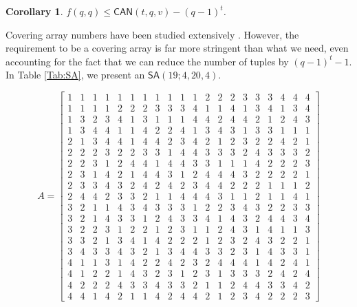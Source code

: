 \documentclass[12pt,reqno]{article}
\newtheorem{crl}[thm]{Corollary}
\newcommand{\SA}{\mathsf{SA}}
\newcommand{\CAN}{\mathsf{CAN}}
\begin{document}
\begin{crl}
 \label{Crl:SA}
$f(q,q) \le \CAN(t,q,v) - (q-1)^t$.
\end{crl}

Covering array numbers have been studied extensively \cite{tables}. However, the requirement to be a covering array is far
more stringent than what we need, even accounting for the fact that we can reduce the number of tuples by $(q-1)^t-1$.
In Table \ref{Tab:SA}, we present an $\SA(19;4,20,4)$.

\setcounter{MaxMatrixCols}{20}
\begin{table}[h]
\[
A = \begin{bmatrix}
1 & 1 & 1 & 1 & 1 & 1 & 1 & 1 & 1 & 1 & 1 & 2 & 2 & 2 & 3 & 3 & 3 & 4 & 4 & 4 
\\
 1 & 1 & 1 & 1 & 2 & 2 & 2 & 3 & 3 & 3 & 4 & 1 & 1 & 4 & 1 & 3 & 4 & 1 & 3 & 4 
\\
 1 & 3 & 2 & 3 & 4 & 1 & 3 & 1 & 1 & 1 & 4 & 4 & 2 & 4 & 4 & 2 & 1 & 2 & 4 & 3 
\\
 1 & 3 & 4 & 4 & 1 & 1 & 4 & 2 & 2 & 4 & 1 & 3 & 4 & 3 & 1 & 3 & 3 & 1 & 1 & 1 
\\
 2 & 1 & 3 & 4 & 4 & 1 & 4 & 4 & 2 & 3 & 4 & 2 & 1 & 2 & 3 & 2 & 2 & 4 & 2 & 1 
\\
 2 & 2 & 2 & 3 & 2 & 2 & 3 & 3 & 1 & 4 & 4 & 3 & 3 & 3 & 2 & 4 & 3 & 3 & 3 & 2 
\\
 2 & 2 & 3 & 1 & 2 & 4 & 4 & 1 & 4 & 4 & 3 & 3 & 1 & 1 & 1 & 4 & 2 & 2 & 2 & 3 
\\
 2 & 3 & 1 & 4 & 2 & 1 & 4 & 4 & 3 & 1 & 2 & 4 & 4 & 4 & 3 & 2 & 2 & 2 & 2 & 1 
\\
 2 & 3 & 3 & 4 & 3 & 2 & 4 & 2 & 4 & 2 & 3 & 4 & 4 & 2 & 2 & 2 & 1 & 1 & 1 & 2 
\\
 2 & 4 & 4 & 2 & 3 & 3 & 2 & 1 & 1 & 4 & 4 & 4 & 3 & 1 & 1 & 2 & 1 & 1 & 4 & 1 
\\
 3 & 2 & 1 & 1 & 4 & 3 & 4 & 3 & 3 & 3 & 1 & 2 & 2 & 3 & 4 & 3 & 2 & 2 & 3 & 3 
\\
 3 & 2 & 1 & 4 & 3 & 3 & 1 & 2 & 4 & 3 & 3 & 4 & 1 & 4 & 3 & 2 & 4 & 4 & 3 & 4 
\\
 3 & 2 & 2 & 3 & 1 & 2 & 2 & 1 & 2 & 3 & 1 & 1 & 2 & 4 & 3 & 1 & 4 & 1 & 1 & 3 
\\
 3 & 3 & 2 & 1 & 3 & 4 & 1 & 4 & 2 & 2 & 2 & 1 & 2 & 3 & 2 & 4 & 3 & 2 & 2 & 1 
\\
 3 & 4 & 3 & 3 & 4 & 3 & 2 & 1 & 3 & 4 & 4 & 3 & 3 & 2 & 3 & 1 & 4 & 3 & 3 & 1 
\\
 4 & 1 & 1 & 3 & 1 & 4 & 2 & 2 & 4 & 2 & 3 & 2 & 4 & 4 & 4 & 1 & 4 & 2 & 4 & 1 
\\
 4 & 1 & 2 & 2 & 1 & 4 & 3 & 2 & 3 & 1 & 2 & 3 & 1 & 3 & 3 & 3 & 2 & 4 & 2 & 4 
\\
 4 & 2 & 2 & 2 & 4 & 3 & 3 & 4 & 3 & 3 & 2 & 1 & 1 & 2 & 4 & 4 & 3 & 3 & 4 & 2 
\\
 4 & 4 & 1 & 4 & 2 & 1 & 1 & 4 & 2 & 4 & 4 & 2 & 1 & 2 & 3 & 4 & 2 & 2 & 2 & 3 
\end{bmatrix}
\]
 \caption{An $\SA(19;4,20,4)$.\label{Tab:SA}}
\end{table} %
\end{document}
